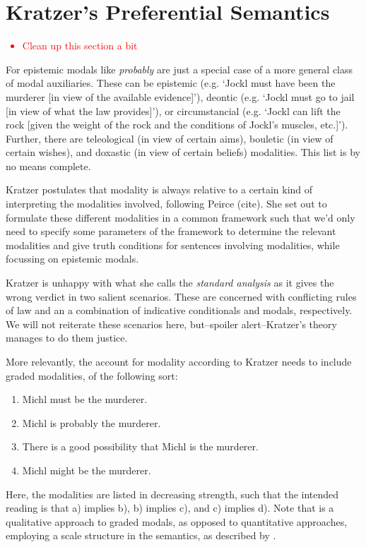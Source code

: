 \documentclass{article}
\theoremstyle{definition}
\newcommand\todo[1]{\textcolor{red}{#1}}
\begin{document}
\section{Kratzer's Preferential Semantics}
\todo{
  \begin{itemize}
    \item Clean up this section a bit
  \end{itemize}
}
For \textcite{kratzer91_modal} epistemic modals like \emph{probably} are just a special case of a more general class of modal auxiliaries.
These can be epistemic (e.g. `Jockl must have been the murderer [in view of the available evidence]'), deontic (e.g. `Jockl must go to jail [in view of what the law provides]'), or circumstancial (e.g. `Jockl can lift the rock [given the weight of the rock and the conditions of Jockl's muscles, etc.]').
Further, there are teleological (in view of certain aims), bouletic (in view of certain wishes), and doxastic (in view of certain beliefs) modalities.
This list is by no means complete.

Kratzer postulates that modality is always relative to a certain kind of interpreting the modalities involved, following Peirce (cite).
She set out to formulate these different modalities in a common framework such that we'd only need to specify some parameters of the framework to determine the relevant modalities and give truth conditions for sentences involving modalities, while focussing on epistemic modals.

Kratzer is unhappy with what she calls the \emph{standard analysis} as it gives the wrong verdict in two salient scenarios.
These are concerned with conflicting rules of law and an a combination of indicative conditionals and modals, respectively.
We will not reiterate these scenarios here, but--spoiler alert--Kratzer's theory manages to do them justice.

More relevantly, the account for modality according to Kratzer needs to include graded modalities, of the following sort:
\begin{enumerate}[nosep,label=\alph*)]
  \item Michl must be the murderer.
  \item Michl is probably the murderer.
  \item There is a good possibility that Michl is the murderer.
  \item Michl might be the murderer.
\end{enumerate}
Here, the modalities are listed in decreasing strength, such that the intended reading is that a) implies b), b) implies c), and c) implies d).
Note that is a qualitative approach to graded modals, as opposed to quantitative approaches, employing a scale structure in the semantics, as described by \textcite{lassiter10_gradab}.
\end{document}
